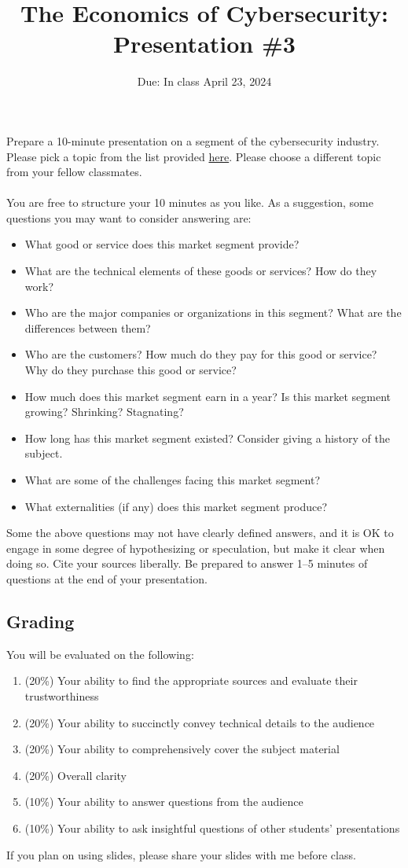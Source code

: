 \documentclass[11pt]{article}
\title{The Economics of Cybersecurity: Presentation \#3}
\author{}
\date{Due: In class April 23, 2024}
\begin{document}
\maketitle

Prepare a 10-minute presentation on a segment of the cybersecurity industry. Please pick a topic from the list provided \href{https://docs.google.com/spreadsheets/d/1SdaMpeCo4CE8o0U_irGhWmVXJYHybRWoiX4uwZYMhCE/edit#gid=2144152383}{here}. Please choose a different topic from your fellow classmates. 
\\
\\
You are free to structure your 10 minutes as you like. As a suggestion, some questions you may want to consider answering are:
\begin{itemize}
    \item What good or service does this market segment provide?
    \item What are the technical elements of these goods or services? How do they work?
    \item Who are the major companies or organizations in this segment? What are the differences between them? 
    \item Who are the customers? How much do they pay for this good or service? Why do they purchase this good or service?
    \item How much does this market segment earn in a year? Is this market segment growing? Shrinking? Stagnating?
    \item How long has this market segment existed? Consider giving a history of the subject.
    \item What are some of the challenges facing this market segment?
    \item What externalities (if any) does this market segment produce?
\end{itemize}

Some the above questions may not have clearly defined answers, and it is OK to engage in some degree of hypothesizing or speculation, but make it clear when doing so. Cite your sources liberally. 
Be prepared to answer 1--5 minutes of questions at the end of your presentation.


\subsection*{Grading}

You will be evaluated on the following:
\begin{enumerate}
    \item (20\%) Your ability to find the appropriate sources and evaluate their trustworthiness
    \item (20\%) Your ability to succinctly convey technical details to the audience
    \item (20\%) Your ability to comprehensively cover the subject material
    \item (20\%) Overall clarity
    \item (10\%) Your ability to answer questions from the audience
    \item (10\%) Your ability to ask insightful questions of other students' presentations
\end{enumerate}

If you plan on using slides, please share your slides with me before class.
\end{document}
